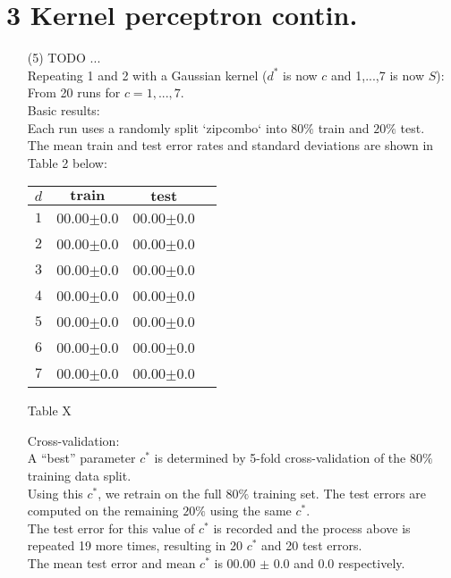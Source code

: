 \documentclass[a4paper,12pt]{article}
\begin{document}
\section*{3 Kernel perceptron contin.}
\begin{enumerate}
\item[(5)] TODO ... \\

Repeating 1 and 2 with a Gaussian kernel  ($d^*$ is now $c$ and {1,...,7} is now $S$):\\
From 20 runs for $c = 1, ... , 7$. \\

Basic results: \\
Each run uses a randomly split `zipcombo` into $80\%$ train and $20\%$ test. \\
The mean train and test error rates and standard deviations are shown in Table 2 below:

\begin{tabular}{|c|c|c|c|}
\hline
$d$&$\textbf{train}$&$\textbf{test}$\\
\hline
$1$&00.00$\pm$0.0&00.00$\pm$0.0\\
\hline
$2$&00.00$\pm$0.0&00.00$\pm$0.0\\
\hline
$3$&00.00$\pm$0.0&00.00$\pm$0.0\\
\hline
$4$&00.00$\pm$0.0&00.00$\pm$0.0\\
\hline
$5$&00.00$\pm$0.0&00.00$\pm$0.0\\
\hline
$6$&00.00$\pm$0.0&00.00$\pm$0.0\\
\hline
$7$&00.00$\pm$0.0&00.00$\pm$0.0\\
\hline
\end{tabular}\par 
Table X

Cross-validation: \\
A “best” parameter $c^*$ is determined by 5-fold cross-validation of the $80\%$ training data split. \\
Using this $c^*$, we retrain on the full $80\%$ training set. The test errors are computed on the remaining $20\%$ using the same $c^*$. \\
The test error for this value of $c^*$ is recorded and the process above is repeated 19 more times, resulting in 20 $c^*$ and 20 test errors.\\
The mean test error and mean $c^*$ is 00.00 $\pm$ 0.0 and 0.0 respectively.



\end{enumerate}
\clearpage
\end{document}
